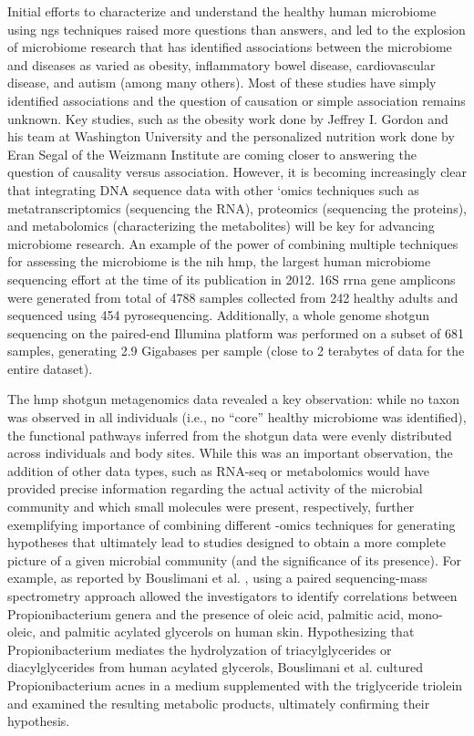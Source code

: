 Initial efforts to characterize and understand the healthy human microbiome using
\gls{ngs} techniques \cite{TheHumanMicrobiomeProjectConsortium2012, Consortium2012}
raised more questions than answers, and led to the explosion of microbiome research
that has identified associations between the microbiome and diseases as varied as
obesity, inflammatory bowel disease, cardiovascular disease, and autism (among many
others). Most of these studies have simply identified associations and the question
of causation or simple association remains unknown. Key studies, such as the obesity
work done by Jeffrey I. Gordon and his team at Washington University
\cite{Turnbaugh2006, Turnbaugh2009, Ridaura2013} and the personalized nutrition
work done by Eran Segal of the Weizmann Institute \cite{Zeevi2017} are coming
closer to answering the question of causality versus association. However, it is
becoming increasingly clear that integrating DNA sequence data with other ‘omics
techniques such as metatranscriptomics (sequencing the RNA), proteomics (sequencing
the proteins), and metabolomics (characterizing the metabolites) will be key for
advancing microbiome research. An example of the power of combining multiple
techniques for assessing the microbiome is the \gls{nih} \gls{hmp}, the largest
human microbiome sequencing effort at the time of its publication in 2012. 16S
\gls{rrna} gene amplicons were generated from total of 4788 samples collected
from 242 healthy adults \cite{TheHumanMicrobiomeProjectConsortium2012} and sequenced
using 454 pyrosequencing. Additionally, a whole genome shotgun sequencing on the
paired-end Illumina platform was performed on a subset of 681 samples, generating
2.9 Gigabases per sample (close to 2 terabytes of data for the entire dataset).

The \gls{hmp} shotgun metagenomics data revealed a key observation: while no taxon
was observed in all individuals (i.e., no “core” healthy microbiome was identified),
the functional pathways inferred from the shotgun data were evenly distributed across
individuals and body sites. While this was an important observation, the addition of
other data types, such as RNA-seq or metabolomics would have provided precise
information regarding the actual activity of the microbial community and which small
molecules were present, respectively, further exemplifying importance of combining
different -omics techniques for generating hypotheses that ultimately lead to studies
designed to obtain a more complete picture of a given microbial community (and the
significance of its presence). For example, as reported by Bouslimani et al.
\cite{Bouslimani2015}, using a paired sequencing-mass spectrometry approach allowed
the investigators to identify correlations between Propionibacterium genera and the
presence of oleic acid, palmitic acid, mono-oleic, and palmitic acylated glycerols
on human skin. Hypothesizing that Propionibacterium mediates the hydrolyzation of
triacylglycerides or diacylglycerides from human acylated glycerols, Bouslimani et al.
cultured Propionibacterium acnes in a medium supplemented with the triglyceride
triolein and examined the resulting metabolic products, ultimately confirming their
hypothesis.


